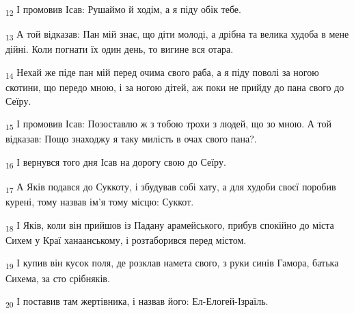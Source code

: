\begin{tcolorbox}
\textsubscript{12} І промовив Ісав: Рушаймо й ходім, а я піду обік тебе.
\end{tcolorbox}
\begin{tcolorbox}
\textsubscript{13} А той відказав: Пан мій знає, що діти молоді, а дрібна та велика худоба в мене дійні. Коли погнати їх один день, то вигине вся отара.
\end{tcolorbox}
\begin{tcolorbox}
\textsubscript{14} Нехай же піде пан мій перед очима свого раба, а я піду поволі за ногою скотини, що передо мною, і за ногою дітей, аж поки не прийду до пана свого до Сеїру.
\end{tcolorbox}
\begin{tcolorbox}
\textsubscript{15} І промовив Ісав: Позоставлю ж з тобою трохи з людей, що зо мною. А той відказав: Пощо знаходжу я таку милість в очах свого пана?.
\end{tcolorbox}
\begin{tcolorbox}
\textsubscript{16} І вернувся того дня Ісав на дорогу свою до Сеїру.
\end{tcolorbox}
\begin{tcolorbox}
\textsubscript{17} А Яків подався до Суккоту, і збудував собі хату, а для худоби своєї поробив курені, тому назвав ім'я тому місцю: Суккот.
\end{tcolorbox}
\begin{tcolorbox}
\textsubscript{18} І Яків, коли він прийшов із Падану арамейського, прибув спокійно до міста Сихем у Краї ханаанському, і розтаборився перед містом.
\end{tcolorbox}
\begin{tcolorbox}
\textsubscript{19} І купив він кусок поля, де розклав намета свого, з руки синів Гамора, батька Сихема, за сто срібняків.
\end{tcolorbox}
\begin{tcolorbox}
\textsubscript{20} І поставив там жертівника, і назвав його: Ел-Елогей-Ізраїль.
\end{tcolorbox}
